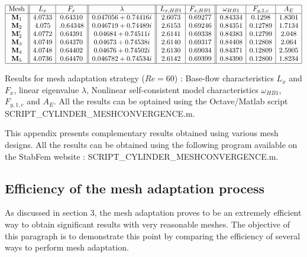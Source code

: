 \documentclass[twocolumn,10pt]{asme2ej}
\begin{document}
\begin{table*}
$$
\begin{array}{|c||c|c||c||c|c||c|c|c|}
\hline
\mbox{Mesh} & L_x & F_x & \lambda & L_{x,HB1} & F_{x,HB1} & \omega_{HB1}  & F_{y,1,c} & A_{E} \\
\hline
\mathbf{M}_1 & 4.0733 & 0.64310	& 0.047056 + 0.74416i 		& 2.6073  & 0.69277 	&  0.84334 & 0.1298 & 1.8301  \\
\mathbf{M}_2 & 4.075 &.  0.64348  	& 0.046719 + 0.74489i 		& 2.6153  & 0.69246 	& 0.84351 & 0.12789 & 1.7134 \\ 
\mathbf{M}_2' & 4.0772 & 0.64391 	& 0.04684 +  0.74511i 		& 2.6141  & 0.69338 	& 0.84383 & 0.12799 & 2.048   \\  
\mathbf{M}_3 & 4.0749 & 0.64370 	& 0.04673 + 0.74538i		& 2.6140     & 0.69317	& 0.84408 & 0.12808 & 2.064   \\ 
\mathbf{M}_4 & 4.0748 & 0.64402 	& 0.04676  + 0.74502i 		& 2.6130 	& 0.69034 	& 0.84371 & 0.12809 & 2.5905 \\
\mathbf{M}_5 & 4.0736 & 0.64470	& 0.046782+0.74534i		& 2.6142 	& 0.69399		& 0.84390 & 0.12800 & 1.8234 \\
\hline
\end{array}
$$
\caption{Results for mesh adaptation strategy ($Re = 60$) : Base-flow characteristics $L_x$ and $F_x$, linear eigenvalue $\lambda$, 
Nonlinear self-consistent model characteristics  $\omega_{HB1}$, $F_{y,1,c}$ and $A_E$. All the results can be optained using the Octave/Matlab script
{\sf SCRIPT\_CYLINDER\_MESHCONVERGENCE.m}. }
\label{tab:conv2}
\end{table*}



This appendix presents complementary results obtained using various mesh designs. 
All the results can be obtained using the following program available on the StabFem website : 
{\sf SCRIPT\_CYLINDER\_MESHCONVERGENCE.m}.

\subsection{Efficiency of the mesh adaptation process}

As discussed in section 3, the mesh adaptation proves to be an extremely efficient way to obtain significant results 
with very reasonable meshes. The objective of this paragraph is to demonstrate this point by comparing the efficiency of several ways to perform mesh adaptation. 
\end{document}
